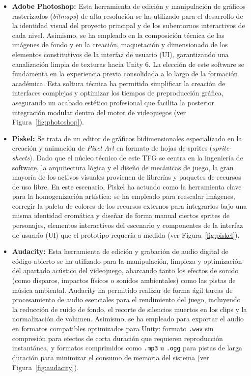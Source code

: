 \begin{itemize}
    \item \textbf{Adobe Photoshop: \cite{photoshop}} Esta herramienta de edición y manipulación de gráficos rasterizados (\textit{bitmaps}) de alta resolución se ha utilizado para el desarrollo de la identidad visual del proyecto principal y de los subentornos interactivos de cada nivel. Asimismo, se ha empleado en la composición técnica de las imágenes de fondo y en la creación, maquetación y dimensionado de los elementos constitutivos de la interfaz de usuario (UI), garantizando una canalización limpia de texturas hacia Unity 6. La elección de este software se fundamenta en la experiencia previa consolidada a lo largo de la formación académica. Esta soltura técnica ha permitido simplificar la creación de interfaces complejas y optimizar los tiempos de preproducción gráfica, asegurando un acabado estético profesional que facilita la posterior integración modular dentro del motor de videojuegos (ver Figura~\ref{fig:photoshop}).
    
    \item \textbf{Piskel: \cite{piskel}} Se trata de un editor de gráficos bidimensionales especializado en la creación y animación de \textit{Pixel Art} en formato de hojas de sprites (\textit{sprite-sheets}). Dado que el núcleo técnico de este TFG se centra en la ingeniería de software, la arquitectura lógica y el diseño de mecánicas de juego, la gran mayoría de los activos visuales provienen de librerías y paquetes de recursos de uso libre. En este escenario, Piskel ha actuado como la herramienta clave para la homogenización artística: se ha empleado para reescalar imágenes, corregir la paleta de colores de los recursos externos para integrarlos bajo una misma identidad cromática y diseñar de forma manual ciertos sprites de personajes, elementos interactivos del escenario y componentes de la interfaz de usuario (UI) que el prototipo requería a medida (ver Figura~\ref{fig:piskel}).
    
    \item \textbf{Audacity: \cite{audacity}} Esta herramienta de edición y grabación de audio digital de código abierto se ha utilizado para la manipulación, limpieza y optimización del apartado acústico del videojuego, abarcando tanto los efectos de sonido (como disparos, impactos físicos o sonidos ambientales) como las pistas de música ambiental. Audacity ha permitido realizar de forma ágil tareas de procesamiento de audio esenciales para el rendimiento del juego, incluyendo la reducción de ruido de fondo, el recorte de silencios muertos en los clips y la normalización de volumen. Asimismo, se ha empleado para exportar el audio en formatos compatibles optimizados para Unity: formato \texttt{.wav} sin compresión para efectos de corta duración que requieren reproducción instantánea, y formatos comprimidos como \texttt{.mp3} u \texttt{.ogg} para pistas de larga duración para minimizar el consumo de memoria del sistema (ver Figura~\ref{fig:audacity}).
\end{itemize}

